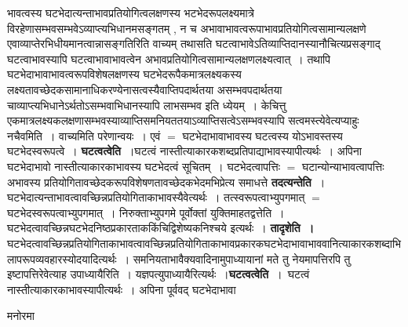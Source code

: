 \documentclass[10pt, openany]{book}
\begin{document}
{भावत्वस्य घटभेदात्यन्ताभावप्रतियोगित्वलक्षणस्य भटभेदरूपलक्ष्यमात्रे विरहेणासम्भवसम्भवेऽव्याप्त्यभिधानमसङ्गतम् , न च अभावाभावत्वरूपाभावप्रतियोगित्वसामान्यलक्षणे एवाव्याप्तेरभिधीयमानत्वान्नासङ्गतिरिति वाच्यम् तथासति घटत्वाभावेऽतिव्याप्तिदानस्यानौचित्यप्रसङ्गाद् घटत्वाभावस्यापि घटत्वाभावाभावत्वेन अभावप्रतियोगित्वसामान्यलक्षणलक्ष्यत्वात्~। तथापि घटभेदाभावाभावत्वरूपविशेषलक्षणस्य घटभेदरूपैकमात्रलक्ष्यकस्य लक्ष्यतावच्छेदकसामानाधिकरण्येनासत्वस्यैवाप्तिपदार्थतया असम्भवपदार्थतया चाव्याप्त्यभिधानेऽर्थतोऽसम्भवाभिधानस्यापि लाभसम्भव इति ध्येयम्~। केचित्तु एकमात्रलक्ष्यकलक्षणासम्भवस्याव्याप्तिसमनियततयाऽव्याप्तिसत्वेऽसम्भवस्यापि सत्वमस्त्येवेत्यप्याहुः नचैवमिति~। वाच्यमिति परेणान्वयः~। एवं $=$ घटभेदाभावाभावस्य घटत्वस्य योऽभावस्तस्य घटभेदस्वरूपत्वे~। \textbf {\qt घटत्वत्वेति~}।घटत्वं नास्तीत्याकारकशब्दप्रतिपाद्याभावस्यापीत्यर्थः~। अपिना घटभेदाभावो नास्तीत्याकारकाभावस्य घटभेदत्वं सूचितम्~। घटभेदत्वापत्तिः $=$ घटान्योन्याभावत्वापत्तिः अभावस्य प्रतियोगितावच्छेदकरूपविशेषणतावच्छेदकभेदमभिप्रेत्य समाधत्ते \textbf {\qt तदत्यन्तेति~}। घटभेदात्यन्ताभावत्वावच्छिन्नप्रतियोगिताकाभावस्यैवेत्यर्थः~। तत्स्वरूपत्वाभ्युपगमात् $=$ घटभेदस्वरूपत्वाभ्युपगमात्~। निरुक्ताभ्युपगमे पूर्वोक्तां युक्तिमाह\textendash  तद्वत्तेति~। घटभेदत्वावच्छिन्नघटभेदनिष्ठप्रकारताककिंचिद्विशेष्यकनिश्चये इत्यर्थः~।\textbf { \qt तादृशेति~।}  घटभेदत्वावच्छिन्नप्रतियोगिताकाभावत्वावच्छिन्नप्रतियोगिताकाभावप्रकारकघटभेदाभावाभाववानित्याकारकशब्दाभिलापरूपव्यवहारस्योदयादित्यर्थः~। समनियताभावैक्यवादिनामुपाध्यायानां मते तु नेयमापत्तिरपि तु इष्टापत्तिरेवेत्याह \textendash उपाध्यायैरिति~। यज्ञपत्युपाध्यायैरित्यर्थः~।\textbf {\qt घटत्वत्वेति~}।~घटत्वं नास्तीत्याकारकाभावस्यापीत्यर्थः~। अपिना पूर्ववद् घटभेदाभावा
\begin{center}   मनोरमा  \end{center}

}
\end{document}
